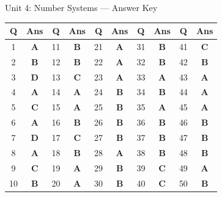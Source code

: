 \begin{answerkeytable}{Unit 4: Number Systems --- Answer Key}
\begin{tabular}{*{10}{c}}
\toprule
\textbf{Q} & \textbf{Ans} & \textbf{Q} & \textbf{Ans} & \textbf{Q} & \textbf{Ans} & \textbf{Q} & \textbf{Ans} & \textbf{Q} & \textbf{Ans} \\
\midrule
1 & \textbf{A} & 11 & \textbf{B} & 21 & \textbf{A} & 31 & \textbf{B} & 41 & \textbf{C} \\
2 & \textbf{B} & 12 & \textbf{B} & 22 & \textbf{A} & 32 & \textbf{B} & 42 & \textbf{B} \\
3 & \textbf{D} & 13 & \textbf{C} & 23 & \textbf{A} & 33 & \textbf{A} & 43 & \textbf{A} \\
4 & \textbf{A} & 14 & \textbf{A} & 24 & \textbf{B} & 34 & \textbf{B} & 44 & \textbf{A} \\
5 & \textbf{C} & 15 & \textbf{A} & 25 & \textbf{B} & 35 & \textbf{A} & 45 & \textbf{A} \\
6 & \textbf{A} & 16 & \textbf{B} & 26 & \textbf{B} & 36 & \textbf{B} & 46 & \textbf{B} \\
7 & \textbf{D} & 17 & \textbf{C} & 27 & \textbf{B} & 37 & \textbf{B} & 47 & \textbf{B} \\
8 & \textbf{A} & 18 & \textbf{B} & 28 & \textbf{A} & 38 & \textbf{B} & 48 & \textbf{B} \\
9 & \textbf{C} & 19 & \textbf{A} & 29 & \textbf{B} & 39 & \textbf{C} & 49 & \textbf{A} \\
10 & \textbf{B} & 20 & \textbf{A} & 30 & \textbf{B} & 40 & \textbf{C} & 50 & \textbf{B} \\
\bottomrule
\end{tabular}
\end{answerkeytable}

